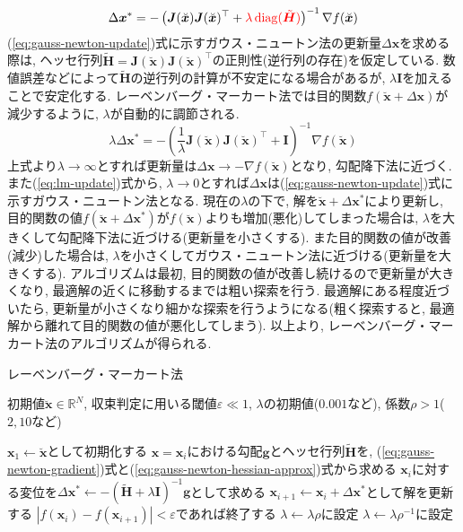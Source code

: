 \documentclass[dvipdfmx,a4paper]{jsarticle}
\begin{document}
\begin{equation}
    \Delta \bm{x}^* = -\left( \bm{J}(\breve{\bm{x}}) \bm{J}(\breve{\bm{x}})^\top
    + {\color{red}\lambda \operatorname{diag}(\tilde{\bm{H}})} \right)^{-1}
    \nabla f(\breve{\bm{x}})
\end{equation}
(\ref{eq:gauss-newton-update})式に示すガウス・ニュートン法の更新量$\Delta \bm{x}$を求める際は, ヘッセ行列$\tilde{\bm{H}} = \bm{J}(\breve{\bm{x}}) \bm{J}(\breve{\bm{x}})^\top$の正則性(逆行列の存在)を仮定している.
数値誤差などによって$\tilde{\bm{H}}$の逆行列の計算が不安定になる場合があるが, $\lambda \bm{I}$を加えることで安定化する.
レーベンバーグ・マーカート法では目的関数$f(\breve{\bm{x}} + \Delta \bm{x})$が減少するように, $\lambda$が自動的に調節される.
\begin{equation}
    \lambda \Delta \bm{x}^* = -\left( \frac{1}{\lambda}
    \bm{J}(\breve{\bm{x}}) \bm{J}(\breve{\bm{x}})^\top
    + \bm{I} \right)^{-1} \nabla f(\breve{\bm{x}})
\end{equation}
上式より$\lambda \to \infty$とすれば更新量は$\Delta \bm{x} \to -\nabla f(\breve{\bm{x}})$となり, 勾配降下法に近づく.
また(\ref{eq:lm-update})式から, $\lambda \to 0$とすれば$\Delta \bm{x}$は(\ref{eq:gauss-newton-update})式に示すガウス・ニュートン法となる.
現在の$\lambda$の下で, 解を$\breve{\bm{x}} + \Delta \bm{x}^*$により更新し, 目的関数の値$f(\breve{\bm{x}} + \Delta \bm{x}^*)$が$f(\breve{\bm{x}})$よりも増加(悪化)してしまった場合は, $\lambda$を大きくして勾配降下法に近づける(更新量を小さくする).
また目的関数の値が改善(減少)した場合は, $\lambda$を小さくしてガウス・ニュートン法に近づける(更新量を大きくする).
アルゴリズムは最初, 目的関数の値が改善し続けるので更新量が大きくなり, 最適解の近くに移動するまでは粗い探索を行う.
最適解にある程度近づいたら, 更新量が小さくなり細かな探索を行うようになる(粗く探索すると, 最適解から離れて目的関数の値が悪化してしまう).
以上より, レーベンバーグ・マーカート法のアルゴリズムが得られる.

\begin{algorithm}[H]
    \caption{レーベンバーグ・マーカート法}
    \label{alg:levenberg-marquardt}
    \begin{algorithmic}[1]
        \Require 初期値$\breve{\bm{x}} \in \mathbb{R}^N$, 収束判定に用いる閾値$\varepsilon \ll 1$, $\lambda$の初期値($0.001$など), 係数$\rho > 1$($2, 10$など)

        \State $\bm{x}_1 \gets \breve{\bm{x}}$として初期化する
            \State $\bm{x} = \bm{x}_i$における勾配$\bm{g}$とヘッセ行列$\tilde{\bm{H}}$を, (\ref{eq:gauss-newton-gradient})式と(\ref{eq:gauss-newton-hessian-approx})式から求める
            \State $\bm{x}_i$に対する変位を$\Delta \bm{x}^* \gets -\left( \tilde{\bm{H}} + \lambda \bm{I} \right)^{-1} \bm{g}$として求める
            \State $\bm{x}_{i + 1} \gets \bm{x}_i + \Delta \bm{x}^*$として解を更新する
            \State $\left| f(\bm{x}_i) - f(\bm{x}_{i + 1}) \right| < \varepsilon$であれば終了する
                \State $\lambda \gets \lambda \rho$に設定
            \Else
                \State $\lambda \gets \lambda \rho^{-1}$に設定
            \EndIf
        \EndFor
    \end{algorithmic}
\end{algorithm}



\end{document}
